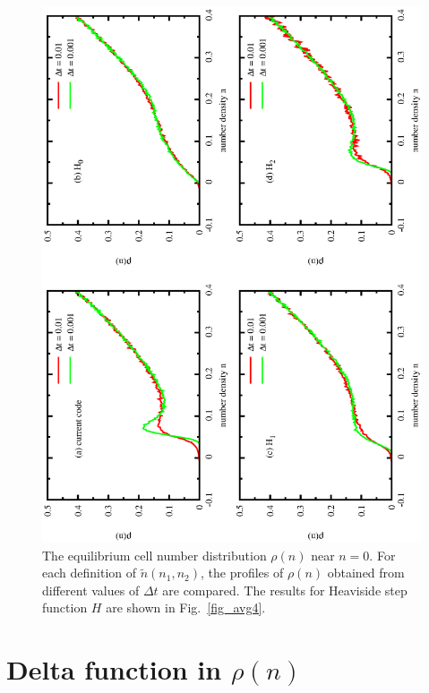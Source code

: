 \documentclass{article}
\begin{document}
\begin{figure}
\centering
\includegraphics[angle=270,width=\linewidth]{fig5/comp_dt.eps}
\caption{\label{fig_comp_dt}The equilibrium cell number distribution $\rho(n)$ near $n=0$. For each definition of $\tilde{n}(n_1,n_2)$, the profiles of $\rho(n)$ obtained from different values of $\Delta t$ are compared. The results for Heaviside step function $H$ are shown in Fig.~\ref{fig_avg4}.}
\end{figure}

\section{Delta function in $\rho(n)$}
\end{document}
